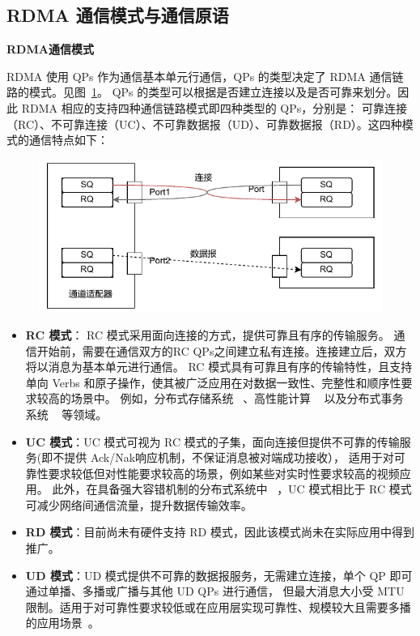 {    \subsection{RDMA 通信模式与通信原语}

    \textbf{RDMA通信模式}

    RDMA 使用 QPs 作为通信基本单元行通信，QPs 的类型决定了 RDMA 通信链路的模式。见图~\ref{fig:rdma-queue-pairs}。
    QPs 的类型可以根据是否建立连接以及是否可靠来划分。因此 RDMA 相应的支持四种通信链路模式即四种类型的 QPs，分别是：
    可靠连接（RC）、不可靠连接（UC）、不可靠数据报（UD）、可靠数据报（RD）。这四种模式的通信特点如下：

    \begin{figure}[!htbp]
        \centering
        \includegraphics[width=\linewidth]{Img/RDMA队列对.drawio.pdf}
        \label{fig:rdma-queue-pairs}
    \end{figure}

    \begin{itemize}
        \item \textbf{RC 模式}： RC 模式采用面向连接的方式，提供可靠且有序的传输服务。
              通信开始前，需要在通信双方的RC QPs之间建立私有连接。连接建立后，双方将以消息为基本单元进行通信。
              RC 模式具有可靠且有序的传输特性，且支持单向 Verbs 和原子操作，使其被广泛应用在对数据一致性、完整性和顺序性要求较高的场景中。
              例如，分布式存储系统 ~\citep{christopher2013pilaf, drago2014farm, xingda2020xstore}、高性能计算 ~\citep{graham2005OpenMPI, Huang2006MVAPICH2} 以及分布式事务系统 ~\citep{xingda2018DrTM+H} 等领域。
        \item \textbf{UC 模式}：UC 模式可视为 RC 模式的子集，面向连接但提供不可靠的传输服务(即不提供 Ack/Nak响应机制，不保证消息被对端成功接收），
              适用于对可靠性要求较低但对性能要求较高的场景，例如某些对实时性要求较高的视频应用。
              此外，在具备强大容错机制的分布式系统中 ~\citep{kalia2014herd}，UC 模式相比于 RC 模式可减少网络间通信流量，提升数据传输效率。
        \item \textbf{RD 模式}：目前尚未有硬件支持 RD 模式，因此该模式尚未在实际应用中得到推广。
        \item \textbf{UD 模式}：UD 模式提供不可靠的数据报服务，无需建立连接，单个 QP 即可通过单播、多播或广播与其他 UD QPs 进行通信，
              但最大消息大小受 MTU 限制。适用于对可靠性要求较低或在应用层实现可靠性、规模较大且需要多播的应用场景~\citep{kalia2014herd,kalia2016fasst}。
    \end{itemize}

}
